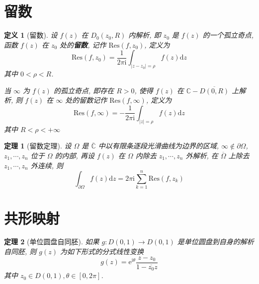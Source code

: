 \documentclass[12pt,a4paper]{article}
\newtheorem{thm}{定理}[section]  %
\newtheorem{definition}{定义}[section] %
\begin{document}
\section{留数}

\begin{definition}[留数]
    设 $f(z)$ 在 $D_0(z_0, R)$ 内解析, 即 $z_0$ 是 $f(z)$ 的一个孤立奇点, 函数 $f(z)$ 在 $z_0$ 处的\textbf{留数}, 记作 $\mathrm{Res}(f, z_0)$, 定义为
    \[\mathrm{Res}(f, z_0) = \frac{1}{2\pi \mathrm{i}} \int_{|z-z_0|=\rho} f(z) \mathrm{d} z\]
    其中 $0 < \rho < R$.

    当 $\infty$ 为 $f(z)$ 的孤立奇点, 即存在 $R>0$, 使得 $f(z)$ 在 $\mathbb{C}-\overline{D(0,R)}$ 上解析, 则 $f(z)$ 在 $\infty$ 处的留数记作 $\mathrm{Res}(f, \infty)$, 定义为
    \[\mathrm{Res}(f, \infty) = - \frac{1}{2\pi \mathrm{i}} \int_{|z|=\rho} f(z) \mathrm{d}z\]
    其中 $R < \rho < +\infty$
\end{definition}

\begin{thm}[留数定理]
    设 $\varOmega$ 是 $\overline{\mathbb{C}}$ 中以有限条逐段光滑曲线为边界的区域, $\infty \notin \partial \varOmega$, $z_1, \cdots, z_n$ 位于 $\varOmega$ 的内部, 
    再设 $f(z)$ 在 $\varOmega$ 内除去 $z_1, \cdots, z_n$ 外解析, 在 $\overline{\varOmega}$ 上除去 $z_1, \cdots, z_n$ 外连续, 则 
    \[\int_{\partial \varOmega} f(z) \mathrm{d}z = 2 \pi \mathrm{i} \sum\limits_{k=1}^n \mathrm{Res}(f, z_k)\]
\end{thm}

\section{共形映射}

\begin{thm}[单位圆盘自同胚]
    如果 $g: D(0,1) \to D(0,1)$ 是单位圆盘到自身的解析自同胚, 则 $g(z)$ 为如下形式的分式线性变换
    \[g(z) = \mathrm{e}^{\mathrm{i} \theta} \frac{z - z_0}{1 - \overline{z_0}z}\]
    其中 $z_0 \in D(0,1), \theta \in [0, 2\pi]$.
\end{thm}
\end{document}

